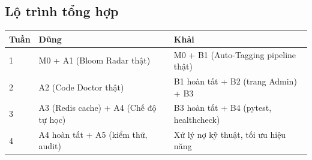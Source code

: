 \documentclass[11pt,a4paper]{article}
\begin{document}
\subsection{Lộ trình tổng hợp}

\begin{longtable}{p{1.2cm} p{6.8cm} p{6.4cm}}
\toprule
\textbf{Tuần} & \textbf{Dũng} & \textbf{Khải} \\
\midrule
\endhead
1 & M0 + A1 (Bloom Radar thật) & M0 + B1 (Auto-Tagging pipeline thật) \\
2 & A2 (Code Doctor thật) & B1 hoàn tất + B2 (trang Admin) + B3 \\
3 & A3 (Redis cache) + A4 (Chế độ tự học) & B3 hoàn tất + B4 (pytest, healthcheck) \\
4 & A4 hoàn tất + A5 (kiểm thử, audit) & Xử lý nợ kỹ thuật, tối ưu hiệu năng \\
\bottomrule
\end{longtable}
\end{document}
